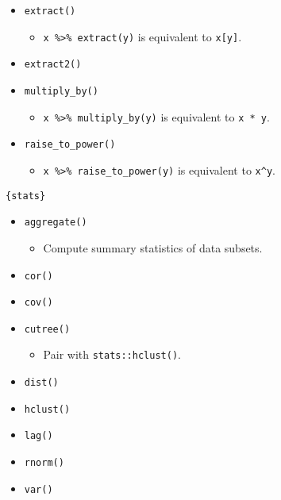 \documentclass[
]{book}
\providecommand{\tightlist}{%
  \setlength{\itemsep}{0pt}\setlength{\parskip}{0pt}}
\begin{document}
\begin{itemize}
\tightlist
\item
  \texttt{extract()}

  \begin{itemize}
  \tightlist
  \item
    \texttt{x\ \%\textgreater{}\%\ extract(y)} is equivalent to \texttt{x{[}y{]}}.
  \end{itemize}
\item
  \texttt{extract2()}
\item
  \texttt{multiply\_by()}

  \begin{itemize}
  \tightlist
  \item
    \texttt{x\ \%\textgreater{}\%\ multiply\_by(y)} is equivalent to \texttt{x\ *\ y}.
  \end{itemize}
\item
  \texttt{raise\_to\_power()}

  \begin{itemize}
  \tightlist
  \item
    \texttt{x\ \%\textgreater{}\%\ raise\_to\_power(y)} is equivalent to \texttt{x\^{}y}.
  \end{itemize}
\end{itemize}

\texttt{\{stats\}}

\begin{itemize}
\tightlist
\item
  \texttt{aggregate()}

  \begin{itemize}
  \tightlist
  \item
    Compute summary statistics of data subsets.
  \end{itemize}
\item
  \texttt{cor()}
\item
  \texttt{cov()}
\item
  \texttt{cutree()}

  \begin{itemize}
  \tightlist
  \item
    Pair with \texttt{stats::hclust()}.
  \end{itemize}
\item
  \texttt{dist()}
\item
  \texttt{hclust()}
\item
  \texttt{lag()}
\item
  \texttt{rnorm()}
\item
  \texttt{var()}
\end{itemize}
\end{document}
